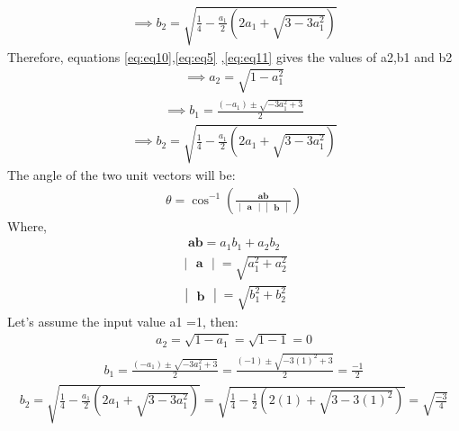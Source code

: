 \documentclass[12pt,-letter paper]{article}
\let\vec\mathbf{}
\let\vec\mathbf{}
\let\vec\mathbf{}
\providecommand{\brak}[1]{\ensuremath{\left(#1\right)}}
\newcommand{\mydet}[1]{\ensuremath{\begin{vmatrix}#1\end{vmatrix}}}
\providecommand{\brak}[1]{\ensuremath{\left(#1\right)}}
\begin{document}
\begin{enumerate}
     \begin{align}
     \implies b_2= \sqrt{\frac{1}{4}-\frac{a_1}{2}\brak{2a_1+\sqrt{3-3a_1^2}}}
     \label{eq:eq11}
      \end{align}
       Therefore, equations \eqref{eq:eq10},\eqref{eq:eq5} ,\eqref{eq:eq11} gives the values of a2,b1 and b2 
      \begin{align}
 \implies   a_2 = \sqrt{1-a_1^2}
     \end{align}
   \begin{align}
\implies  b_1 = \frac{ (-a_1)\pm \sqrt{-3a_1^2+3}}{2}
  \end{align}  
  \begin{align}
   \implies b_2= \sqrt{\frac{1}{4}-\frac{a_1}{2}\brak{2a_1+\sqrt{3-3a_1^2}}}
      \end{align}
      The angle of the two unit vectors will be:
      \begin{align}
         \theta = \cos^{-1}\brak{{\frac{\vec{a}\vec{b}}{\mydet{\vec{a}}\mydet{\vec{b}}}}}
      \end{align}
      Where,
       \begin{align}
      \vec{ab}=a_1b_1 +a_2b_2
       \end{align}
        \begin{align}
      \mydet{\vec{a}} = \sqrt{a_1^2+a_2^2}
       \end{align}
        \begin{align}
      \mydet{\vec{b}} = \sqrt{b_1^2+b_2^2}
       \end{align}
       Let's assume the input value a1 =1, then:
       \begin{align}
    a_2=\sqrt{1-a_1} = \sqrt{1-1} =0
       \end{align}
        \begin{align}
b_1=  \frac{ (-a_1)\pm \sqrt{-3a_1^2+3}}{2} =  \frac{ (-1)\pm \sqrt{-3(1)^2+3}}{2} = \frac{-1}{2}
          \end{align}
          \begin{align}
   b_2= \sqrt{\frac{1}{4}-\frac{a_1}{2}\brak{2a_1+\sqrt{3-3a_1^2}}} = \sqrt{\frac{1}{4}-\frac{1}{2}\brak{2(1)+\sqrt{3-3(1)^2}}} =\sqrt{\frac{-3}{4}}
       \end{align}
  \end{enumerate}
\end{document}
